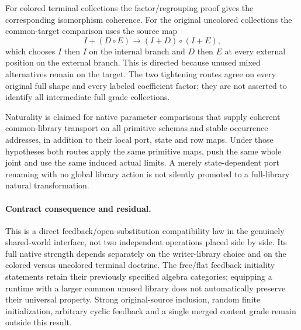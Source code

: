 \documentclass[11pt]{article}
\begin{document}
For colored terminal collections the factor/regrouping proof gives the corresponding isomorphism coherence. For the original uncolored collections the common-target comparison uses the source map
\[
 I+(D\circ E)\longrightarrow (I+D)\circ(I+E),
\]
which chooses $I$ then $I$ on the internal branch and $D$ then $E$ at every external position on the external branch. This is directed because unused mixed alternatives remain on the target. The two tightening routes agree on every original full shape and every labeled coefficient factor; they are not asserted to identify all intermediate full grade collections.

Naturality is claimed for native parameter comparisons that supply coherent common-library transport on all primitive schemas and stable occurrence addresses, in addition to their local port, state and row maps. Under those hypotheses both routes apply the same primitive maps, push the same whole joint and use the same induced actual limits. A merely state-dependent port renaming with no global library action is not silently promoted to a full-library natural transformation.

\paragraph{Contract consequence and residual.} This is a direct feedback/open-substitution compatibility law in the genuinely shared-world interface, not two independent operations placed side by side. Its full native strength depends separately on the writer-library choice and on the colored versus uncolored terminal doctrine. The free/flat feedback initiality statements retain their previously specified algebra categories; equipping a runtime with a larger common unused library does not automatically preserve their universal property. Strong original-source inclusion, random finite initialization, arbitrary cyclic feedback and a single merged content grade remain outside this result.
\end{document}
